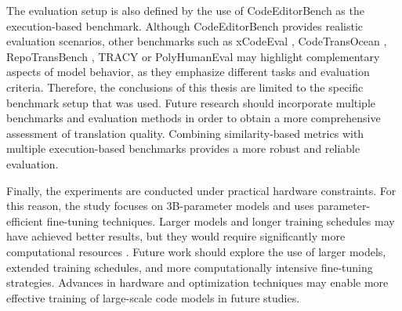 The evaluation setup is also defined by the use of CodeEditorBench as the
execution-based benchmark. Although
CodeEditorBench provides realistic evaluation scenarios, other benchmarks such
as xCodeEval \cite{xcodeeval}, CodeTransOcean \cite{codetransocean},
RepoTransBench \cite{repotransbench}, TRACY \cite{tracy_benchmark} or
PolyHumanEval \cite{mhumaneval} may highlight complementary aspects of model behavior, as they emphasize different tasks and evaluation criteria. Therefore, the conclusions
of this thesis are limited to the specific benchmark setup that was used. Future
research should incorporate multiple benchmarks and evaluation methods in order
to obtain a more comprehensive assessment of translation quality. Combining
similarity-based metrics with multiple execution-based benchmarks provides a more robust and reliable evaluation.

Finally, the experiments are conducted under practical hardware constraints. For this reason, the study focuses on 3B-parameter models and uses
parameter-efficient fine-tuning techniques. Larger
models and longer training schedules may have achieved better results, but they
would require significantly more computational resources \cite{hu2021lora}.
Future work should explore the use of larger models, extended training
schedules, and more computationally intensive fine-tuning strategies. Advances
in hardware and optimization techniques may enable more effective training of
large-scale code models in future studies.